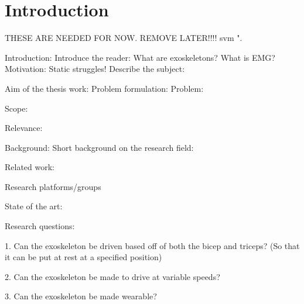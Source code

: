 \section{Introduction}
\label{section:intro}

THESE ARE NEEDED FOR NOW. REMOVE LATER!!!! \cite{IEEEtran, IEEEtranformatexample, webpage, FundConDep, exampleofjournalarticle, exampleofconferencepaper}
\ac{svm} \cite{exampleofconferencepaper}".

Introduction:
    Introduce the reader:
        What are exoskeletons?
        What is EMG?
    Motivation:
        Static struggles!
    Describe the subject:
        

    Aim of the thesis work:
        Problem formulation:
            Problem:

            Scope:
            
            Relevance: %


Background: 
    Short background on the research field:

    Related work:

    Research platforms/groups

    State of the art:





Research questions:

1.	Can the exoskeleton be driven based off of both the bicep and triceps? (So that it can be put at rest at a specified position)

2.	Can the exoskeleton be made to drive at variable speeds?

3.	Can the exoskeleton be made wearable?

